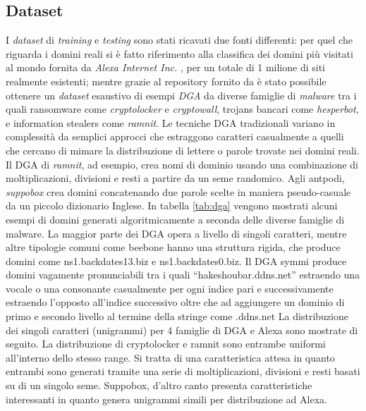\subsection{Dataset}
\label{randomforestdataset}
I \textit{dataset} di \textit{training} e \textit{testing} sono stati ricavati due fonti differenti: per quel che riguarda i domini reali si è fatto riferimento alla classifica dei domini più visitati al mondo fornita da \textit{Alexa Internet Inc.} \cite{amazon:alexa} , per un totale di 1 milione di siti realmente esistenti; mentre grazie al repository fornito da \cite{github:dgarepo} è stato possibile ottenere un \textit{dataset} esaustivo di esempi \textit{DGA} da diverse famiglie di \textit{malware} tra i quali ransomware come \textit{cryptolocker} e \textit{cryptowall}, trojans bancari come \textit{hesperbot}, e information stealers come \textit{ramnit}. Le tecniche DGA tradizionali variano in complessità da semplici approcci che estraggono caratteri casualmente a quelli che cercano di mimare la distribuzione di lettere o parole trovate nei domini reali. Il DGA di \textit{ramnit}, ad esempio, crea nomi di dominio usando una combinazione di moltiplicazioni, divisioni e resti a partire da un seme randomico. Agli antpodi, \textit{suppobox} crea domini concatenando due parole scelte in maniera pseudo-casuale da un piccolo dizionario Inglese.
In tabella \ref{tab:dga} vengono mostrati alcuni esempi di domini generati algoritmicamente a seconda delle diverse famiglie di malware.
La maggior parte dei DGA opera a livello di singoli caratteri, mentre altre tipologie comuni come beebone hanno una struttura rigida, che produce domini come ns1.backdates13.biz e ns1.backdates0.biz.
Il DGA symmi produce domini vagamente pronunciabili tra i quali “hakeshoubar.ddns.net” estraendo una vocale o una consonante casualmente per ogni indice pari e successivamente estraendo l’opposto all’indice successivo oltre che ad aggiungere un dominio di primo e secondo livello al termine della stringe come .ddns.net
La distribuzione dei singoli caratteri (unigrammi) per 4 famiglie di DGA e Alexa sono mostrate di seguito. La distribuzione di cryptolocker e ramnit sono entrambe uniformi all’interno dello stesso range. Si tratta di una caratteristica attesa in quanto entrambi sono generati tramite una serie di moltiplicazioni, divisioni e resti basati su di un singolo seme. Suppobox, d’altro canto presenta caratteristiche interessanti in quanto genera unigrammi simili per distribuzione ad Alexa. 

